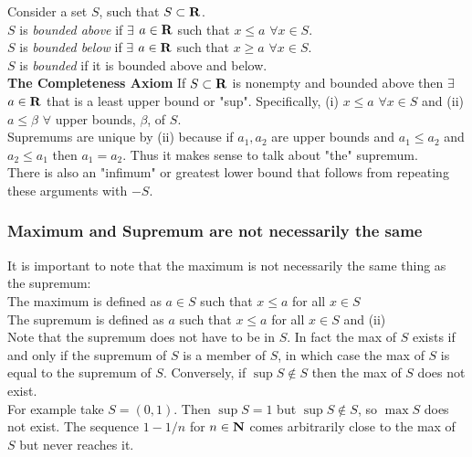 \documentclass[12pt]{article}
\begin{document}
    Consider a set $S$, such that $S \subset \mathbf{R}$.\\
    $S$ is \emph{bounded above} if $\exists$ $a \in \mathbf{R}$ such that $x \leq a$ $\forall x \in S$.\\
    $S$ is \emph{bounded below} if $\exists$ $a \in \mathbf{R}$ such that $x \geq a$ $\forall x \in S$.\\
    $S$ is \emph{bounded} if it is bounded above and below.\\

    \textbf{The Completeness Axiom} If $S \subset \mathbf{R}$ is nonempty and bounded above then $\exists$ $a \in \mathbf{R}$
    that is a least upper bound or "sup". Specifically, (i) $x \leq a$ $\forall x \in S$ and (ii) $a \leq \beta$ $\forall$ 
    upper bounds, $\beta$, of $S$.\\

    Supremums are unique by (ii) because if $a_1,a_2$ are upper bounds and $a_1 \leq a_2$ and $a_2 \leq a_1$ then $a_1 = a_2$.
    Thus it makes sense to talk about "the" supremum.\\

    There is also an "infimum" or greatest lower bound that follows from repeating these arguments with $-S$.

    \subsubsection{Maximum and Supremum are not necessarily the same}
      It is important to note that the maximum is not necessarily the same thing as the supremum:\\

      The maximum is defined as $a \in S$ such that $x \leq a$ for all $x \in S$\\
      The supremum is defined as $a$ such that $x \leq a$ for all $x \in S$ and (ii)\\

      Note that the supremum does not have to be in $S$. In fact the max of $S$ exists if and only if the supremum of $S$
      is a member of $S$, in which case the max of $S$ is equal to the supremum of $S$. Conversely, if $\sup S \notin S$ then
      the max of $S$ does not exist.\\

      For example take $S = (0,1)$. Then $\sup S = 1$ but $\sup S \notin S$, so $\max S$ does not exist. The sequence
      $1 - 1/n$ for $n \in \mathbf{N}$ comes arbitrarily close to the max of $S$ but never reaches it.\\
\end{document}
